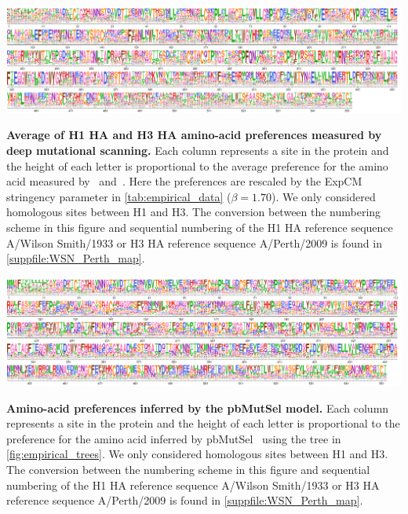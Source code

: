\documentclass[11pt]{article}
\begin{document}
\begin{suppfig}[H]
\centerline{\includegraphics[width=\textwidth]{figures/prefs_average}}
\caption{\label{suppfig:prefs_average}
\textbf{Average of H1 HA  and H3 HA amino-acid preferences measured by deep mutational scanning.}
Each column represents a site in the protein and the height of each letter is proportional to the average preference for the amino acid measured by~\citet{doud2016accurate} and~\citet{lee2018deep}. 
Here the preferences are rescaled by the ExpCM stringency parameter in \ref{tab:empirical_data} ($\beta=1.70$). 
We only considered homologous sites between H1 and H3. 
The conversion between the numbering scheme in this figure and sequential numbering of the H1 HA reference sequence A/Wilson Smith/1933 or H3 HA reference sequence A/Perth/2009 is found in \ref{suppfile:WSN_Perth_map}. 
}
\end{suppfig}

\begin{suppfig}[H]
\centerline{\includegraphics[width=\textwidth]{figures/prefs_mutSel}}
\caption{\label{suppfig:prefs_mutSel}
\textbf{Amino-acid preferences inferred by the pbMutSel model.}
Each column represents a site in the protein and the height of each letter is proportional to the preference for the amino acid inferred by pbMutSel~\citep{rodrigue2014site} using the tree in \ref{fig:empirical_trees}. 
We only considered homologous sites between H1 and H3. 
The conversion between the numbering scheme in this figure and sequential numbering of the H1 HA reference sequence A/Wilson Smith/1933 or H3 HA reference sequence A/Perth/2009 is found in \ref{suppfile:WSN_Perth_map}. 
}
\end{suppfig}
\end{document}
